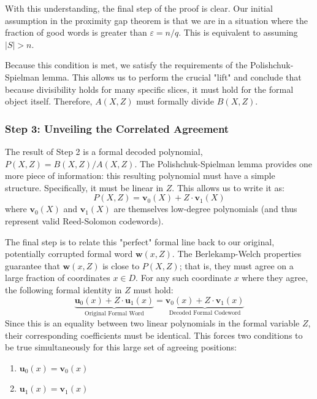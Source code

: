 \documentclass{article}
\begin{document}
With this understanding, the final step of the proof is clear. Our initial assumption in the proximity gap theorem is that we are in a situation where the fraction of good words is greater than $\varepsilon = n/q$. This is equivalent to assuming $|S| > n$.

Because this condition is met, we satisfy the requirements of the Polishchuk-Spielman lemma. This allows us to perform the crucial "lift" and conclude that because divisibility holds for many specific slices, it must hold for the formal object itself. Therefore, $A(X,Z)$ must formally divide $B(X,Z)$.


\subsubsection{Step 3: Unveiling the Correlated Agreement}
The result of Step 2 is a formal decoded polynomial, $P(X,Z) = B(X,Z) / A(X,Z)$. The Polishchuk-Spielman lemma provides one more piece of information: this resulting polynomial must have a simple structure. Specifically, it must be linear in $Z$. This allows us to write it as:
\[ P(X,Z) = \mathbf{v}_0(X) + Z \cdot \mathbf{v}_1(X) \]
where $\mathbf{v}_0(X)$ and $\mathbf{v}_1(X)$ are themselves low-degree polynomials (and thus represent valid Reed-Solomon codewords).

The final step is to relate this "perfect" formal line back to our original, potentially corrupted formal word $\mathbf{w}(x,Z)$. The Berlekamp-Welch properties guarantee that $\mathbf{w}(x,Z)$ is close to $P(X,Z)$; that is, they must agree on a large fraction of coordinates $x \in D$. For any such coordinate $x$ where they agree, the following formal identity in $Z$ must hold:
\[ \underbrace{\mathbf{u}_0(x) + Z \cdot \mathbf{u}_1(x)}_{\text{Original Formal Word}} = \underbrace{\mathbf{v}_0(x) + Z \cdot \mathbf{v}_1(x)}_{\text{Decoded Formal Codeword}} \]
Since this is an equality between two linear polynomials in the formal variable $Z$, their corresponding coefficients must be identical. This forces two conditions to be true simultaneously for this large set of agreeing positions:
\begin{enumerate}
    \item $\mathbf{u}_0(x) = \mathbf{v}_0(x)$
    \item $\mathbf{u}_1(x) = \mathbf{v}_1(x)$
\end{enumerate}
\end{document}
